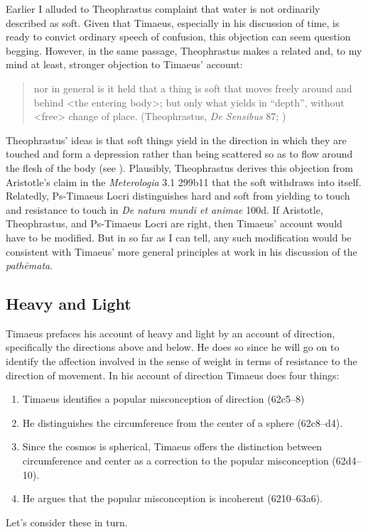 Earlier I alluded to Theophrastus complaint that water is not ordinarily described as soft. Given that Timaeus, especially in his discussion of time, is ready to convict ordinary speech of confusion, this objection can seem question begging. However, in the same passage, Theophrastus makes a related and, to my mind at least, stronger objection to Timaeus' account:
\begin{quote}
	nor in general is it held that a thing is soft that moves freely around and behind <the entering body>; but only what yields in ``depth'', without <free> change of place. (Theophrastus, \emph{De Sensibus} 87; \citealt[147]{Stratton:1917vn})
\end{quote}
Theophrastus' ideas is that soft things yield in the direction in which they are touched and form a depression rather than being scattered so as to flow around the flesh of the body (see \citealt[213, n230]{Stratton:1917vn}). Plausibly, Theophrastus derives this objection from Aristotle's claim in the \emph{Meterologia} 3.1 299b11 that the soft withdraws into itself. Relatedly, Ps-Timaeus Locri distinguishes hard and soft from yielding to touch and resistance to touch in \emph{De natura mundi et animae} 100d. If Aristotle, Theophrastus, and Ps-Timaeus Locri are right, then Timaeus' account would have to be modified. But in so far as I can tell, any such modification would be consistent with Timaeus' more general principles at work in his discussion of the \emph{pathēmata}.


\subsection{Heavy and Light} %
\label{sub:heavy_and_light}

Timaeus prefaces his account of heavy and light by an account of direction, specifically the directions above and below. He does so since he will go on to identify the affection involved in the sense of weight in terms of resistance to the direction of movement. In his account of direction Timaeus does four things:
\begin{enumerate}
	\item Timaeus identifies a popular misconception of direction (62c5--8)
	\item He distinguishes the circumference from the center of a sphere (62c8--d4).
	\item Since the cosmos is spherical, Timaeus offers the distinction between circumference and center as a correction to the popular misconception (62d4--10).
	\item He argues that the popular misconception is incoherent (6210--63a6).
\end{enumerate}
Let's consider these in turn.

